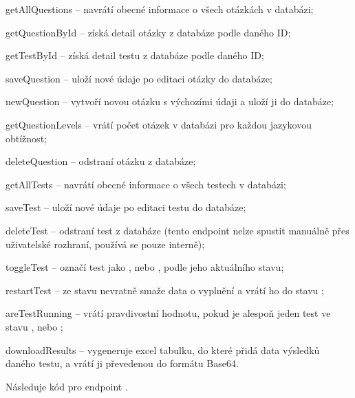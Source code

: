 \begin{compactitem}
    \item getAllQuestions -- navrátí obecné informace o všech otázkách v databázi;
    \item getQuestionById -- získá detail otázky z databáze podle daného ID;
    \item getTestById -- získá detail testu z databáze podle daného ID;
    \item saveQuestion -- uloží nové údaje po editaci otázky do databáze;
    \item newQuestion -- vytvoří novou otázku s výchozími údaji a uloží ji do databáze;
    \item getQuestionLevels -- vrátí počet otázek v databázi pro každou jazykovou obtížnost;
    \item deleteQuestion -- odstraní otázku z databáze;
    \item getAllTests -- navrátí obecné informace o všech testech v databázi;
    \item saveTest -- uloží nové údaje po editaci testu do databáze;
    \item deleteTest -- odstraní test z databáze (tento endpoint nelze spustit manuálně přes uživatelské rozhraní, používá se pouze interně);
    \item toggleTest -- označí test jako , nebo , podle jeho aktuálního stavu;
    \item restartTest -- ze stavu  nevratně smaže data o vyplnění a vrátí ho do stavu ;
    \item areTestRunning -- vrátí pravdivostní hodnotu, pokud je alespoň jeden test ve stavu , nebo ;
    \item downloadResults -- vygeneruje excel tabulku, do které přidá data výsledků daného testu, a vrátí ji převedenou do formátu Base64.
\end{compactitem}

Následuje kód pro endpoint .


